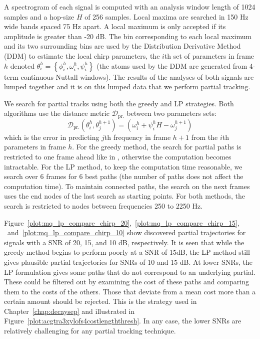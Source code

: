 \documentclass{article}
\begin{document}
\begin{sloppy}
A spectrogram of each signal is computed with an analysis window length of 1024
samples and a hop-size $H$ of 256 samples. Local maxima are searched in 150 Hz
wide bands spaced 75 Hz apart. A local maximum is only accepted if its amplitude
is greater than -20 dB. The bin corresponding to each local maximum and its two
surrounding bins are used by the Distribution Derivative Method
(DDM) to estimate the
local chirp parameters, the $i$th set of parameters in frame $h$ denoted
$\theta_{i}^{h} = \left\{ \phi_{i}^{h} , \omega_{i}^{h} , \psi_{i}^{h}
\right\}$ (the atoms used by the DDM are generated from 4-term continuous
Nuttall windows). The results of the analyses of both signals are lumped together and
it is on this lumped data that we perform partial tracking.

We search for partial tracks using both the greedy and LP strategies. Both
algorithms use the distance metric $\mathcal{D}_{\text{pr.}}$ between two parameters sets:
\[
    \mathcal{D}_{\text{pr.}} \left( \theta_{i}^{h},
    \theta_{j}^{h+1} \right) = \left( \omega_{i}^{h} +
    \psi_{i}^{h} H - \omega_{j}^{h+1} \right)
\]
which is the error in predicting $j$th frequency in frame $h+1$ from the $i$th
parameters in frame $h$. For the greedy method, the search for partial paths is
restricted to one frame ahead like in \cite{mcaulay1986speech}, otherwise the
computation becomes intractable. For the LP
method, to keep the computation time reasonable, we search over 6 frames for 6
best paths (the number of paths does not affect the computation time).
To maintain connected paths, the search on the next frames uses the end nodes of
the last search as starting points. For both methods, the search is restricted
to nodes between frequencies 250 to 2250 Hz.

Figure~\ref{plot:mq_lp_compare_chirp_20},~\ref{plot:mq_lp_compare_chirp_15},%
~and~\ref{plot:mq_lp_compare_chirp_10}
show discovered partial trajectories for signals with a SNR of 20, 15, and 10
dB,
respectively. It is seen that while the greedy method begins to perform poorly
at a SNR of 15dB, the LP method still gives plausible partial trajectories for
SNRs of 10 and 15 dB. At lower SNRs, the LP formulation gives
some paths that do not correspond to an underlying partial. These could be filtered
out by examining the cost of these paths and comparing them to the costs of the
others. Those that deviate from a mean cost more than a certain amount should be
rejected. This is the strategy used in Chapter~\ref{chap:decaysep} and
illustrated in Figure~\ref{plot:acgtra3xylofs4costlengththresh}. In any case,
the lower SNRs are relatively challenging for any partial tracking technique.


\end{sloppy}
\end{document}
